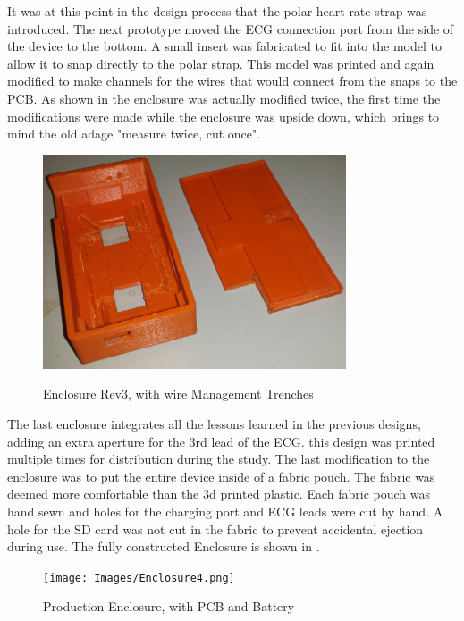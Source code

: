 It was at this point in the design process that the polar heart rate strap was introduced. The next prototype moved the ECG connection port from the side of the device to the bottom. A small insert was fabricated to fit into the model to allow it to snap directly to the polar strap. This model was printed and again modified to make channels for the wires that would connect from the snaps to the PCB. As shown in  the enclosure was actually modified twice, the first time the modifications were made while the enclosure was upside down, which brings to mind the old adage "measure twice, cut once". 

\begin{figure}[ht]
 \begin{center}
  \label{fig:enclosure3}
  \includegraphics[scale=1,width=0.8\textwidth]{Images/Enclosure3.png} 
  \caption{Enclosure Rev3, with wire Management Trenches} 
 \end{center}
\end{figure}


The last enclosure integrates all the lessons learned in the previous designs, adding an extra aperture for the 3rd lead of the ECG. this design was printed multiple times for distribution during the study. The last modification to the enclosure was to put the entire device inside of a fabric pouch. The fabric was deemed more comfortable than the 3d printed plastic. Each fabric pouch was hand sewn and holes for the charging port and ECG leads were cut by hand. A hole for the SD card was not cut in the fabric to prevent accidental ejection during use. The fully constructed Enclosure is shown in .

\begin{figure}[ht]
 \begin{center}
  \label{fig:enclosure4}
  \texttt{[image: Images/Enclosure4.png]} 
  \caption{Production Enclosure, with PCB and Battery} 
 \end{center}
\end{figure}

